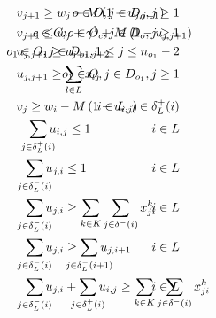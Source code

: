 \documentclass[authoryear,preprint,review,11pt]{elsarticle}
\begin{document}
{\begin{alignat}{3}
    \label{mod:c16}        & v_{j+1} \geq w_{j} - M\left(1- u_{j,j+1}\right)   & \hspace{-50mm}  o \in O, j \in D_{o}, j \geq 1  \text{ }    \\
    \label{mod:c17}        & v_{j+1}  \leq  w_{j} + \gamma^1 + M\left(1- u_{j,j+1}\right)    & \hspace{-60mm} c \in C, o \in O_c, j \in D_{o}, j \geq 1 \text{ }     \\
    \label{mod:c18}        & u_{j,j+1} \geq u_{j+1,j+2}      & \hspace{-70mm} o_1 \in O,  j \in D_{o_1}, 1 \leq j \leq n_{o_{1}}-2 \text{ }   \\
    \label{mod:c19}        & u_{j,j+1} \geq \sum_{l \in L}{x_{lj}}   & \hspace{-60mm}  o_1 \in O, j \in D_{o_1}, j \geq 1 \text{ }                   \\
    \label{mod:c20}        & v_{j} \geq w_{i} - M\left(1- u_{i,j}\right)   & \hspace{-40mm}  i \in L, j \in \delta^{+}_{L}(i) \text{ }  \\
    \label{mod:c21}        & \hspace{3mm} \smashoperator{ \sum_{ j \in \delta^{+}_{L}(i)}}{u_{i,j } } \leq 1     & \hspace{-40mm}  i \in L \text{ }         \\
    \label{mod:c22}        & \hspace{2mm} \smashoperator{ \sum_{ j \in \delta^{-}_{L}(i)}}{u_{j,i } } \leq 1                                      & \hspace{-40mm} i \in L           \text{ }       \\
    \label{mod:c230}       & \hspace{2mm} \smashoperator{ \sum_{ j \in \delta^{-}_{L}(i)}}{u_{j,i } }  \geq \sum_{k \in K}\sum_{j \in  \delta^{-}(i) }{x^k_{ji}}    & \hspace{-40mm} i \in L \text{ }                                                      \\
    \label{mod:c231}       & \hspace{2mm} \smashoperator{ \sum_{ j \in \delta^{-}_{L}(i)}}{u_{j,i } } \geq \smashoperator{ \sum_{ j \in \delta^{-}_{L}(i+1)}}{u_{j,i+1 } }   & \hspace{-20mm} i \in L  \text{ }                                                        \\
    \label{mod:c23}        & \hspace{2mm} \smashoperator{ \sum_{ j \in \delta^{-}_{L}(i)}}{u_{j,i } } + \smashoperator{ \sum_{ j \in \delta^{+}_{L}(i)}}{u_{i,j } } \geq \sum_{k \in K}\sum_{j \in  \delta^{-}(i) }{x^k_{ji}}    & \hspace{-20mm} i \in L  \text{ }                                                        \\

\end{alignat}}
\end{document}
